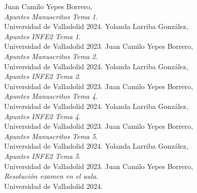 \documentclass{article}
\begin{document}
\begin{thebibliography}{9}
    Juan Camilo Yepes Borrero, \\ \textit{Apuntes Manuscritos Tema 1}. \\ Universidad de Valladolid 2024.
    Yolanda Larriba González, \\ \textit{Apuntes INFE2 Tema 1}. \\ Universidad de Valladolid 2023.
    Juan Camilo Yepes Borrero, \\ \textit{Apuntes Manuscritos Tema 2}. \\ Universidad de Valladolid 2024.
    Yolanda Larriba González, \\ \textit{Apuntes INFE2 Tema 2}. \\ Universidad de Valladolid 2023.
    Juan Camilo Yepes Borrero, \\ \textit{Apuntes Manuscritos Tema 4}. \\ Universidad de Valladolid 2024.
    Yolanda Larriba González, \\ \textit{Apuntes INFE2 Tema 4}. \\ Universidad de Valladolid 2023.
    Juan Camilo Yepes Borrero, \\ \textit{Apuntes Manuscritos Tema 5}. \\ Universidad de Valladolid 2024.
    Yolanda Larriba González, \\ \textit{Apuntes INFE2 Tema 5}. \\ Universidad de Valladolid 2023.
    Juan Camilo Yepes Borrero, \\ \textit{Resolución examen en el aula}. \\ Universidad de Valladolid 2024.
\end{thebibliography}

\end{document}
